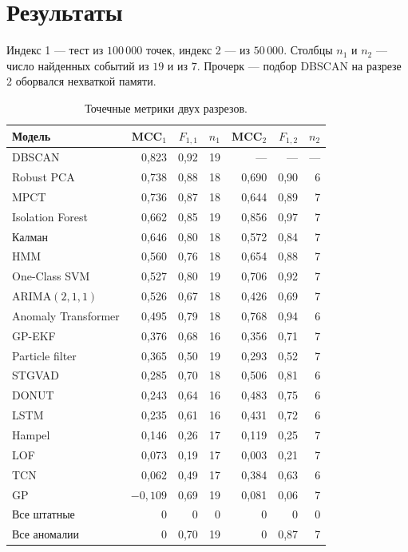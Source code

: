 \documentclass[a4paper,12pt]{report}
\begin{document}
\section{Результаты}

Индекс 1 --- тест из \(100\,000\) точек, индекс 2 --- из \(50\,000\). Столбцы \(n_1\) и \(n_2\) --- число найденных событий из \(19\) и из \(7\). Прочерк --- подбор DBSCAN на разрезе 2 оборвался нехваткой памяти.

\begin{table}[H]
\centering
\caption{Точечные метрики двух разрезов.}
\footnotesize
\singlespacing
\setlength{\tabcolsep}{4pt}
\begin{tabular}{@{}lrrrrrr@{}}
\toprule
Модель & MCC\(_1\) & \(F_{1,1}\) & \(n_1\) & MCC\(_2\) & \(F_{1,2}\) & \(n_2\) \\
\midrule
DBSCAN & 0,823 & 0,92 & 19 & --- & --- & --- \\
Robust PCA & 0,738 & 0,88 & 18 & 0,690 & 0,90 & 6 \\
MPCT & 0,736 & 0,87 & 18 & 0,644 & 0,89 & 7 \\
Isolation Forest & 0,662 & 0,85 & 19 & 0,856 & 0,97 & 7 \\
Калман & 0,646 & 0,80 & 18 & 0,572 & 0,84 & 7 \\
HMM & 0,560 & 0,76 & 18 & 0,654 & 0,88 & 7 \\
One-Class SVM & 0,527 & 0,80 & 19 & 0,706 & 0,92 & 7 \\
ARIMA\((2,1,1)\) & 0,526 & 0,67 & 18 & 0,426 & 0,69 & 7 \\
Anomaly Transformer & 0,495 & 0,79 & 18 & 0,768 & 0,94 & 6 \\
GP-EKF & 0,376 & 0,68 & 16 & 0,356 & 0,71 & 7 \\
Particle filter & 0,365 & 0,50 & 19 & 0,293 & 0,52 & 7 \\
STGVAD & 0,285 & 0,70 & 18 & 0,506 & 0,81 & 6 \\
DONUT & 0,243 & 0,64 & 16 & 0,483 & 0,75 & 6 \\
LSTM & 0,235 & 0,61 & 16 & 0,431 & 0,72 & 6 \\
Hampel & 0,146 & 0,26 & 17 & 0,119 & 0,25 & 7 \\
LOF & 0,073 & 0,19 & 17 & 0,003 & 0,21 & 7 \\
TCN & 0,062 & 0,49 & 17 & 0,384 & 0,63 & 6 \\
GP & $-0{,}109$ & 0,69 & 19 & 0,081 & 0,06 & 7 \\
Все штатные & 0 & 0 & 0 & 0 & 0 & 0 \\
Все аномалии & 0 & 0,70 & 19 & 0 & 0,87 & 7 \\
\bottomrule
\end{tabular}
\end{table}
\end{document}
